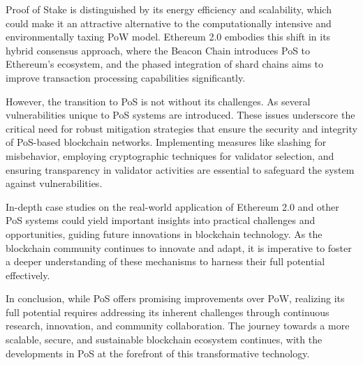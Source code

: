 Proof of Stake is distinguished by its energy efficiency and scalability, which could make it an attractive alternative to the computationally intensive and environmentally taxing PoW model. Ethereum 2.0 embodies this shift in its hybrid consensus approach, where the Beacon Chain introduces PoS to Ethereum's ecosystem, and the phased integration of shard chains aims to improve transaction processing capabilities significantly.

However, the transition to PoS is not without its challenges. As several vulnerabilities unique to PoS systems are introduced. These issues underscore the critical need for robust mitigation strategies that ensure the security and integrity of PoS-based blockchain networks. Implementing measures like slashing for misbehavior, employing cryptographic techniques for validator selection, and ensuring transparency in validator activities are essential to safeguard the system against vulnerabilities.

In-depth case studies on the real-world application of Ethereum 2.0 and other PoS systems could yield important insights into practical challenges and opportunities, guiding future innovations in blockchain technology. As the blockchain community continues to innovate and adapt, it is imperative to foster a deeper understanding of these mechanisms to harness their full potential effectively.

In conclusion, while PoS offers promising improvements over PoW, realizing its full potential requires addressing its inherent challenges through continuous research, innovation, and community collaboration. The journey towards a more scalable, secure, and sustainable blockchain ecosystem continues, with the developments in PoS at the forefront of this transformative technology.